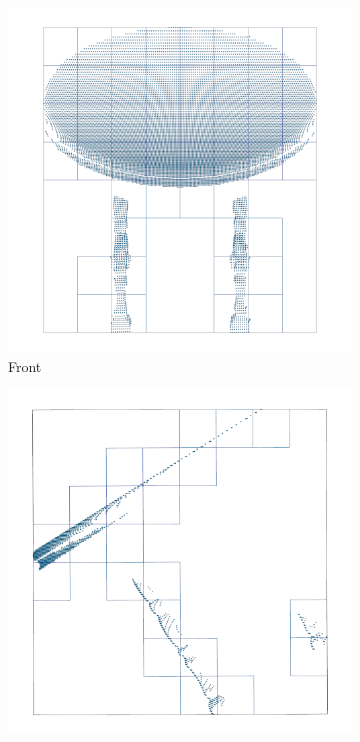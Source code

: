 \begin{figure}[!t]
	\centering
	\hfill
	\begin{subfigure}{0.325\textwidth}
		\centering
		\includegraphics[width=\linewidth]{Figures/ObjRecog/surface_grid_front}
		\caption{Front}
		\label{subfig:objrecog:grid_occ:front}
	\end{subfigure}
	\hfill
	\begin{subfigure}{0.325\textwidth}
		\centering
		\includegraphics[width=\linewidth]{Figures/ObjRecog/surface_grid_side}

\end{subfigure}
\end{figure}
